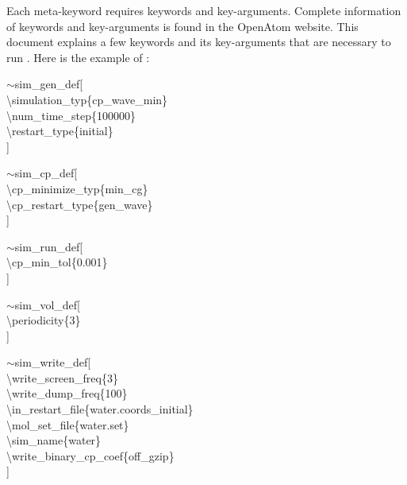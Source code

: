 \documentclass[letterpaper,12pt]{article}
\begin{document}
Each meta-keyword requires keywords and key-arguments. Complete information of keywords and key-arguments is found in the OpenAtom website. This document explains a few keywords and its key-arguments that are necessary to run {\selectfont{cp\_wave\_min}}.
Here is the example of {\selectfont{water.input}}:

{\selectfont
$\sim$sim\_gen\_def[\\
\textbackslash simulation\_typ\{cp\_wave\_min\} \\
\textbackslash num\_time\_step\{100000\} \\ 
\textbackslash restart\_type\{initial\}\\
 ]
 
$\sim$sim\_cp\_def[\\
\textbackslash cp\_minimize\_typ\{min\_cg\}\\
\textbackslash cp\_restart\_type\{gen\_wave\}\\
 ]

$\sim$sim\_run\_def[\\
\textbackslash cp\_min\_tol\{0.001\}\\
 ]

$\sim$sim\_vol\_def[\\
\textbackslash periodicity\{3\}\\
 ]

$\sim$sim\_write\_def[\\
\textbackslash write\_screen\_freq\{3\}\\
\textbackslash write\_dump\_freq\{100\}\\
\textbackslash in\_restart\_file\{water.coords\_initial\}\\
\textbackslash mol\_set\_file\{water.set\}\\
\textbackslash sim\_name\{water\}\\
\textbackslash write\_binary\_cp\_coef\{off\_gzip\}\\
 ]
}
\end{document}
